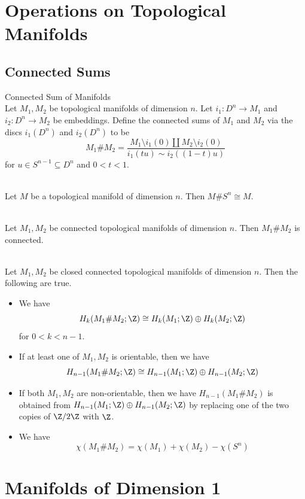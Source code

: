 \documentclass[a4paper]{article}
\begin{document}
\pagebreak
\section{Operations on Topological Manifolds}
\subsection{Connected Sums}
\begin{defn}{Connected Sum of Manifolds}{}\\
Let $M_1,M_2$ be topological manifolds of dimension $n$. Let $i_1:D^n\to M_1$ and $i_2:D^n\to M_2$ be embeddings. Define the connected sums of $M_1$ and $M_2$ via the discs $i_1(D^n)$ and $i_2(D^n)$ to be $$M_1\# M_2=\frac{M_1\setminus i_1(0)\amalg M_2\setminus i_2(0)}{i_1(tu)\sim i_2((1-t)u)}$$ for $u\in S^{n-1}\subseteq D^n$ and $0<t<1$. 
\end{defn}

\begin{lmm}{}{}\\
Let $M$ be a topological manifold of dimension $n$. Then $M\# S^n\cong M$. 
\end{lmm}

\begin{lmm}{}{}\\
Let $M_1,M_2$ be connected topological manifolds of dimension $n$. Then $M_1\# M_2$ is connected. 
\end{lmm}

\begin{prp}{}{}\\
Let $M_1,M_2$ be closed connected topological manifolds of dimension $n$. Then the following are true. 
\begin{itemize}
\item We have $$H_k(M_1\# M_2;\Z)\cong H_k(M_1;\Z)\oplus H_k(M_2;\Z)$$ for $0<k<n-1$. 
\item If at least one of $M_1,M_2$ is orientable, then we have $$H_{n-1}(M_1\# M_2;\Z)\cong H_{n-1}(M_1;\Z)\oplus H_{n-1}(M_2;\Z)$$
\item If both $M_1,M_2$ are non-orientable, then we have $H_{n-1}(M_1\# M_2)$ is obtained from $H_{n-1}(M_1;\Z)\oplus H_{n-1}(M_2;\Z)$ by replacing one of the two copies of $\Z/2\Z$ with $\Z$. 
\item We have $$\chi(M_1\# M_2)=\chi(M_1)+\chi(M_2)-\chi(S^n)$$
\end{itemize}
\end{prp}

\pagebreak
\section{Manifolds of Dimension 1}
\end{document}
